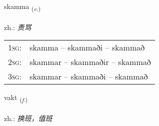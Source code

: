 \documentclass[frontgrid, backgrid]{flacards}\usepackage[]{graphicx}\usepackage[]{xcolor}
\begin{document}
\renewcommand{\flhead}{\vskip5pt \fboxsep=0pt {\small\bfseries\footnotesize Sagnorð | 动词}}
\renewcommand{\fcfoot}{\vskip5pt \fboxsep=0pt \hspace{2pt}{\small\bfseries\footnotesize 3K}}

\renewcommand{\blhead}{\vskip5pt {\small\bfseries\footnotesize Sagnorð | 动词 }}
\renewcommand{\bcfoot}{\vskip5pt \hspace{2pt}{\small\bfseries\footnotesize 3K}}


{skamma \small{\textsubscript{(\textit{v.})}} \\[1ex] %
\textphonetic{[skama]} \\
zh.: \emph{责骂} \\  [2ex]
\renewcommand*{\arraystretch}{0.8}
\begin{tabular}{p{1cm}l}
\textsc{1sg}: & skamma -- skammaði -- skammað \\ 
\textsc{2sg}: & skammar -- skammaðir -- skammað \\ 
\textsc{3sg}: & skammar -- skammaði -- skammað \\ 
\end{tabular}
}

\renewcommand{\flhead}{\vskip5pt \fboxsep=0pt {\small\bfseries\footnotesize Nafnorð | 名词}}
\renewcommand{\fcfoot}{\vskip5pt \fboxsep=0pt \hspace{2pt}{\small\bfseries\footnotesize 3K}}

\renewcommand{\blhead}{\vskip5pt {\small\bfseries\footnotesize Nafnorð | 名词 }}
\renewcommand{\bcfoot}{\vskip5pt \hspace{2pt}{\small\bfseries\footnotesize 3K}}


{vakt \small{\textsubscript{(\textit{f.})}} \\[1ex] %
\textphonetic{[vaxt]} \\
zh.: \emph{换班，值班} \\  [2ex]
\renewcommand*{\arraystretch}{0.8}
}
\end{document}

